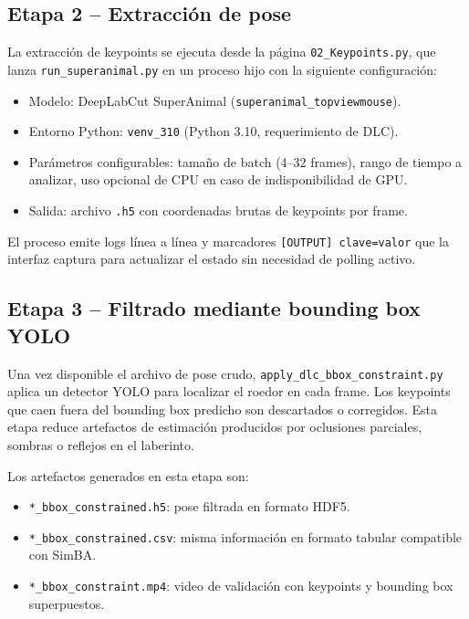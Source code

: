 \documentclass[12pt]{report}
\begin{document}
\subsection{Etapa 2 -- Extracción de pose}

La extracción de keypoints se ejecuta desde la página \texttt{02\_Keypoints.py},
que lanza \texttt{run\_superanimal.py} en un proceso hijo con la siguiente configuración:

\begin{itemize}[leftmargin=*]
    \item Modelo: DeepLabCut SuperAnimal (\texttt{superanimal\_topviewmouse}).
    \item Entorno Python: \texttt{venv\_310} (Python 3.10, requerimiento de DLC).
    \item Parámetros configurables: tamaño de batch (4--32 frames), rango de tiempo a analizar,
          uso opcional de CPU en caso de indisponibilidad de GPU.
    \item Salida: archivo \texttt{.h5} con coordenadas brutas de keypoints por frame.
\end{itemize}

El proceso emite logs línea a línea y marcadores \texttt{[OUTPUT] clave=valor}
que la interfaz captura para actualizar el estado sin necesidad de polling activo.

\subsection{Etapa 3 -- Filtrado mediante bounding box YOLO}

Una vez disponible el archivo de pose crudo, \texttt{apply\_dlc\_bbox\_constraint.py}
aplica un detector YOLO para localizar el roedor en cada frame. Los keypoints
que caen fuera del bounding box predicho son descartados o corregidos. Esta etapa
reduce artefactos de estimación producidos por oclusiones parciales, sombras o
reflejos en el laberinto.

Los artefactos generados en esta etapa son:
\begin{itemize}[leftmargin=*]
    \item \texttt{*\_bbox\_constrained.h5}: pose filtrada en formato HDF5.
    \item \texttt{*\_bbox\_constrained.csv}: misma información en formato tabular compatible con SimBA.
    \item \texttt{*\_bbox\_constraint.mp4}: video de validación con keypoints y bounding box superpuestos.
\end{itemize}
\end{document}
